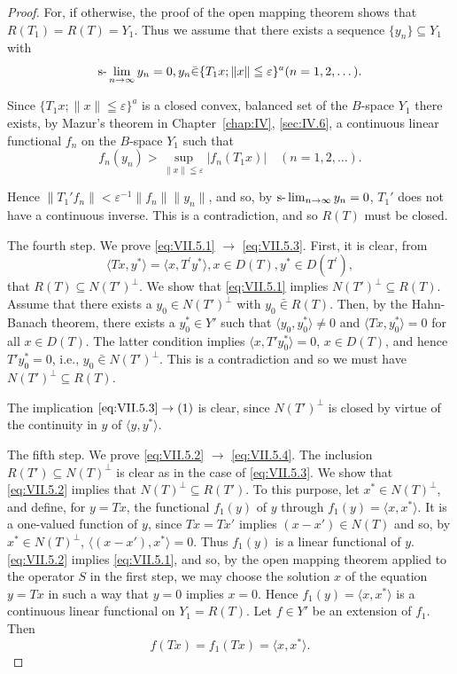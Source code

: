 \begin{proof}
For, if otherwise, the proof of the open mapping theorem shows that $R(T_{1}) = R(T) = Y_{1}$. Thus we assume that there exists a sequence $\{y_{n}\} \subseteq Y_{1}$ with 
\[
\text{s-}\lim _{n \to \infty} y _{n} = 0, y _{n} \bar {\in} \{T _{1} x; \| x \| \leqq \varepsilon \} ^{a} (n = 1, 2, \dots).
\]

Since $\{T_{1}x;\|x\|\leqq\varepsilon\}^{a}$ is a closed convex, balanced set of the $B$-space $Y_{1}$ there exists, by Mazur's theorem in Chapter~\ref{chap:IV}, \ref{sec:IV.6}, a continuous linear functional $f_{n}$ on the $B$-space $Y_{1}$ such that 
\[
f _{n} (y _{n}) > \sup\limits _{\| x \| \leqq \varepsilon} | f _{n} (T _{1} x) | \quad (n = 1, 2, \dots).
\]

Hence $\| T_1'f_n\| < \varepsilon^{-1} \| f_n\| \| y_n\|$, and so, by $\text{s-}\lim\nolimits_{n\to \infty}y_n = 0$, $T_1'$ does not have a continuous inverse. This is a contradiction, and so $R(T)$ must be closed. 

The fourth step. We prove \eqref{eq:VII.5.1} $\rightarrow$ \eqref{eq:VII.5.3}. First, it is clear, from 
\[
\langle T x, y ^{*} \rangle = \langle x, T ^{\prime} y ^{*} \rangle , x \in D (T), y ^{*} \in D \left(T ^{\prime}\right),
\]
that $R(T) \subseteq N(T')^\perp$. We show that \eqref{eq:VII.5.1} implies $N(T')^\perp \subseteq R(T)$. Assume that there exists a $y_0 \in N(T')^\perp$ with $y_0 \bar{\in} R(T)$. Then, by the Hahn-Banach theorem, there exists a $y_0^* \in Y'$ such that $\langle y_0, y_0^* \rangle \neq 0$ and $\langle Tx, y_0^* \rangle = 0$ for all $x \in D(T)$. The latter condition implies $\langle x, T'y_0^* \rangle = 0$, $x \in D(T)$, and hence $T'y_0^* = 0$, i.e., $y_0 \bar{\in} N(T')^\perp$. This is a contradiction and so we must have $N(T')^\perp \subseteq R(T)$. 

The implication $\eqref{eq:VII.5.3} \to (1)$ is clear, since $N(T')^\perp$ is closed by virtue of the continuity in $y$ of $\langle y, y^* \rangle$. 

The fifth step. We prove \eqref{eq:VII.5.2} $\rightarrow$ \eqref{eq:VII.5.4}. The inclusion $R(T') \subseteq N(T)^\perp$ is clear as in the case of \eqref{eq:VII.5.3}. We show that \eqref{eq:VII.5.2} implies that $N(T)^\perp \subseteq R(T')$. To this purpose, let $x^* \in N(T)^\perp$, and define, for $y = Tx$, the functional $f_1(y)$ of $y$ through $f_1(y) = \langle x, x^* \rangle$. It is a one-valued function of $y$, since $Tx = Tx'$ implies $(x - x') \in N(T)$ and so, by $x^* \in N(T)^\perp$, $\langle (x - x'), x^* \rangle = 0$. Thus $f_1(y)$ is a linear functional of $y$. \eqref{eq:VII.5.2} implies \eqref{eq:VII.5.1}, and so, by the open mapping theorem applied to the operator $S$ in the first step, we may choose the solution $x$ of the equation $y = Tx$ in such a way that \slim $y = 0$ implies \slim $x = 0$. Hence $f_{1}(y) = \langle x, x^{*} \rangle$ is a continuous linear functional on $Y_{1} = R(T)$. Let $f \in Y'$ be an extension of $f_{1}$. Then 
\[
f (T x) = f _{1} (T x) = \langle x, x ^{*} \rangle .
\]


\end{proof}
